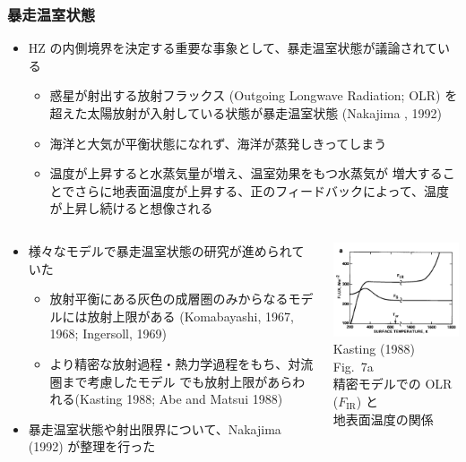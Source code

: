 \documentclass[aspectratio=149,9pt,fleqn]{beamer}
\begin{document}
\begin{frame}
	\frametitle{暴走温室状態}
	\begin{itemize}
		\item HZ の内側境界を決定する重要な事象として、暴走温室状態が議論されている
			\begin{itemize}
				\item 惑星が射出する放射フラックス (Outgoing Longwave Radiation; OLR)
					を超えた太陽放射が入射している状態が暴走温室状態 (Nakajima \etal*, 1992)
				\item 海洋と大気が平衡状態になれず、海洋が蒸発しきってしまう
				\item 温度が上昇すると水蒸気量が増え、温室効果をもつ水蒸気が
					増大することでさらに地表面温度が上昇する、正のフィードバックによって、温度
					が上昇し続けると想像される
			\end{itemize}
	\end{itemize}
	\begin{columns}[T,onlytextwidth]
		\begin{column}{.65\textwidth}
			\begin{itemize}
				\item 様々なモデルで暴走温室状態の研究が進められていた
					\begin{itemize}
						\item 放射平衡にある灰色の成層圏のみからなるモデルには放射上限がある
							(Komabayashi, 1967, 1968; Ingersoll, 1969)
						\item より精密な放射過程・熱力学過程をもち、対流圏まで考慮したモデル
							でも放射上限があらわれる(Kasting 1988; Abe and Matsui 1988)
					\end{itemize}
				\item 暴走温室状態や射出限界について、Nakajima \etal (1992) が整理を行った
			\end{itemize}
		\end{column}
		\begin{column}{.3\textwidth}
			\centering\small
			\includegraphics[width=.95\textwidth]{kasting7a.png}\\
			Kasting (1988) Fig.\ 7a\\
			精密モデルでの OLR (\(F_{\mathrm{IR}}\)) と\\
			地表面温度の関係
		\end{column}
	\end{columns}
\end{frame}
\end{document}
